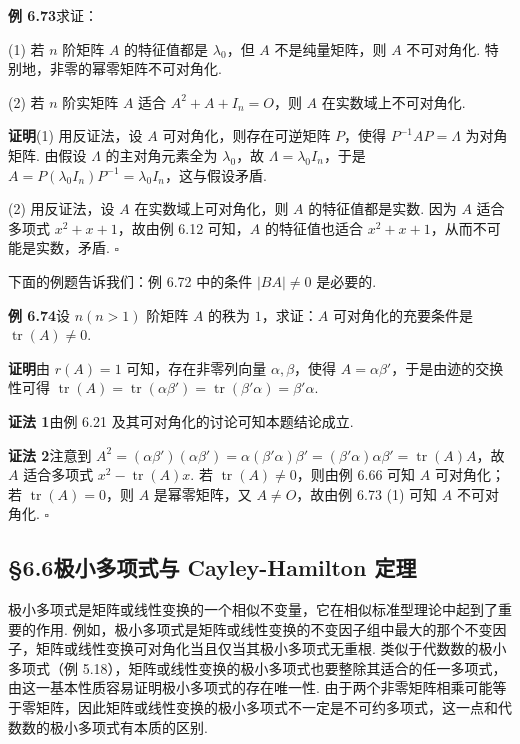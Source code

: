 \documentclass[UTF8, 12pt, fontset=fandol, oneside]{ctexart}
\begin{document}
\noindent\textbf{例 6.73}\quad 求证：

(1) 若 $n$ 阶矩阵 $A$ 的特征值都是 $\lambda_0$，但 $A$ 不是纯量矩阵，则 $A$ 不可对角化. 特别地，非零的幂零矩阵不可对角化.

(2) 若 $n$ 阶实矩阵 $A$ 适合 $A^2+A+I_n=O$，则 $A$ 在实数域上不可对角化.

\noindent\textbf{证明}\quad (1) 用反证法，设 $A$ 可对角化，则存在可逆矩阵 $P$，使得 $P^{-1}AP=\Lambda$ 为对角矩阵. 由假设 $\Lambda$ 的主对角元素全为 $\lambda_0$，故 $\Lambda=\lambda_0I_n$，于是 $A=P(\lambda_0I_n)P^{-1}=\lambda_0I_n$，这与假设矛盾.

(2) 用反证法，设 $A$ 在实数域上可对角化，则 $A$ 的特征值都是实数. 因为 $A$ 适合多项式 $x^2+x+1$，故由例 6.12 可知，$A$ 的特征值也适合 $x^2+x+1$，从而不可能是实数，矛盾. $\square$

下面的例题告诉我们：例 6.72 中的条件 $|BA|\ne 0$ 是必要的.

\noindent\textbf{例 6.74}\quad 设 $n(n>1)$ 阶矩阵 $A$ 的秩为 $1$，求证：$A$ 可对角化的充要条件是 $\operatorname{tr}(A)\ne 0$.

\noindent\textbf{证明}\quad 由 $r(A)=1$ 可知，存在非零列向量 $\alpha,\beta$，使得 $A=\alpha\beta'$，于是由迹的交换性可得 $\operatorname{tr}(A)=\operatorname{tr}(\alpha\beta')=\operatorname{tr}(\beta'\alpha)=\beta'\alpha$.

\noindent\textbf{证法 1}\quad 由例 6.21 及其可对角化的讨论可知本题结论成立.

\noindent\textbf{证法 2}\quad 注意到 $A^2=(\alpha\beta')(\alpha\beta')=\alpha(\beta'\alpha)\beta'=(\beta'\alpha)\alpha\beta'=\operatorname{tr}(A)A$，故 $A$ 适合多项式 $x^2-\operatorname{tr}(A)x$. 若 $\operatorname{tr}(A)\ne 0$，则由例 6.66 可知 $A$ 可对角化；若 $\operatorname{tr}(A)=0$，则 $A$ 是幂零矩阵，又 $A\ne O$，故由例 6.73 (1) 可知 $A$ 不可对角化. $\square$

\subsection*{§6.6\quad 极小多项式与 Cayley-Hamilton 定理}

极小多项式是矩阵或线性变换的一个相似不变量，它在相似标准型理论中起到了重要的作用. 例如，极小多项式是矩阵或线性变换的不变因子组中最大的那个不变因子，矩阵或线性变换可对角化当且仅当其极小多项式无重根. 类似于代数数的极小多项式（例 5.18），矩阵或线性变换的极小多项式也要整除其适合的任一多项式，由这一基本性质容易证明极小多项式的存在唯一性. 由于两个非零矩阵相乘可能等于零矩阵，因此矩阵或线性变换的极小多项式不一定是不可约多项式，这一点和代数数的极小多项式有本质的区别.
\end{document}
